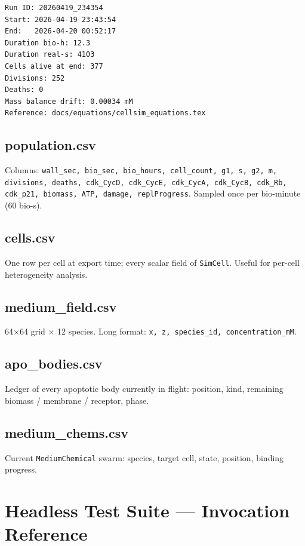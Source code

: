 \documentclass[11pt,letterpaper,twoside,openany]{book}
\newcommand{\code}[1]{\texttt{#1}}
\begin{document}
\begin{verbatim}
Run ID: 20260419_234354
Start: 2026-04-19 23:43:54
End:   2026-04-20 00:52:17
Duration bio-h: 12.3
Duration real-s: 4103
Cells alive at end: 377
Divisions: 252
Deaths: 0
Mass balance drift: 0.00034 mM
Reference: docs/equations/cellsim_equations.tex
\end{verbatim}

\section{population.csv}

Columns:
\code{wall\_sec, bio\_sec, bio\_hours, cell\_count, g1, s, g2, m,
divisions, deaths, cdk\_CycD, cdk\_CycE, cdk\_CycA, cdk\_CycB,
cdk\_Rb, cdk\_p21, biomass, ATP, damage, replProgress}.
Sampled once per bio-minute (60 bio-s).

\section{cells.csv}

One row per cell at export time; every scalar field of
\code{SimCell}. Useful for per-cell heterogeneity analysis.

\section{medium\_field.csv}

64\(\times\)64 grid \(\times\) 12 species. Long format:
\texttt{x, z, species\_id, concentration\_mM}.

\section{apo\_bodies.csv}

Ledger of every apoptotic body currently in flight: position,
kind, remaining biomass / membrane / receptor, phase.

\section{medium\_chems.csv}

Current \code{MediumChemical} swarm: species, target cell, state,
position, binding progress.

\chapter{Headless Test Suite --- Invocation Reference}
\label{ch:tests-deep}
\end{document}
